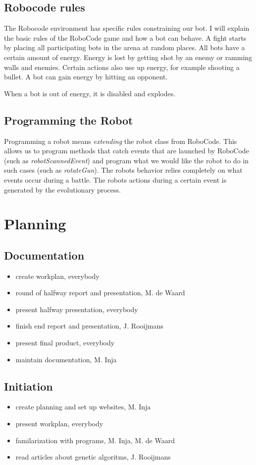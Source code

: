 \documentclass[a4paper,10pt]{article}
\begin{document}
\subsection{Robocode rules}
The Robocode environment has specific rules constraining our bot. I will explain the basic rules of the RoboCode game and how a bot can behave.
A fight starts by placing all participating bots in the arena at random places. All bots have a certain amount of energy. Energy is lost by getting shot by an enemy or ramming walls and enemies. Certain actions also use up energy, for example shooting a bullet.
A bot can gain energy by hitting an opponent.

When a bot is out of energy, it is disabled and explodes.

\subsection{Programming the Robot}
Programming a robot means \textit{extending} the robot class from RoboCode. This allows us to program methods that catch events that are launched by RoboCode (such as \textit{robotScannedEvent}) and program what we would like the robot to do in such cases (such as \textit{rotateGun}). The robots behavior relies completely on what events occur during a battle. The robots actions during a certain event is generated by the evolutionary process. 

\newpage
\section{Planning}
\subsection{Documentation}
\begin{itemize}
 \item create workplan, everybody
 \item round of halfway report and presentation, M. de Waard
 \item present halfway presentation, everybody
 \item finish end report and presentation, J. Rooijmans
 \item present final product, everybody
 \item maintain documentation, M. Inja
\end{itemize}

\subsection{Initiation}
\begin{itemize}
\item create planning and set up websites, M. Inja
\item present workplan, everybody
\item familarization with programs, M. Inja, M. de Waard
\item read articles about genetic algoritms, J. Rooijmans
\end{itemize}
\end{document}
